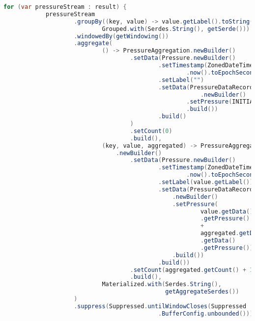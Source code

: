 \begin{lstlisting}[caption={Implementacja w klasie PressureMeanStreamFactory}, label={lst:pressure_mean_stream_factory},language=Java]
        for (var pressureStream : result) {
            pressureStream
                    .groupBy((key, value) -> value.getLabel().toString(),
                            Grouped.with(Serdes.String(), getSerde()))
                    .windowedBy(getWindowing())
                    .aggregate(
                            () -> PressureAggregation.newBuilder()
                                    .setData(Pressure.newBuilder()
                                            .setTimestamp(ZonedDateTime
                                                    .now().toEpochSecond())
                                            .setLabel("")
                                            .setData(PressureDataRecord
                                                        .newBuilder()
                                                    .setPressure(INITIAL_VALUE)
                                                    .build())
                                            .build()
                                    )
                                    .setCount(0)
                                    .build(),
                            (key, value, aggregated) -> PressureAggregation
                                .newBuilder()
                                    .setData(Pressure.newBuilder()
                                            .setTimestamp(ZonedDateTime
                                                    .now().toEpochSecond())
                                            .setLabel(value.getLabel())
                                            .setData(PressureDataRecord
                                                .newBuilder()
                                                .setPressure(
                                                        value.getData()
                                                        .getPressure() 
                                                        + 
                                                        aggregated.getData()
                                                        .getData()
                                                        .getPressure())
                                                .build())
                                            .build())
                                    .setCount(aggregated.getCount() + 1)
                                    .build(),
                            Materialized.with(Serdes.String(), 
                                              getAggregateSerdes())
                    )
                    .suppress(Suppressed.untilWindowCloses(Suppressed
                                            .BufferConfig.unbounded()))

\end{lstlisting}
